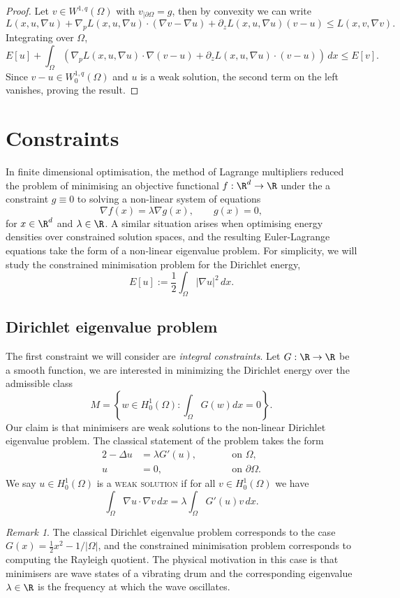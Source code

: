 \documentclass[reqno]{amsart}
\theoremstyle{definition}
\theoremstyle{remark}
\newtheorem*{remark}{Remark}
\renewcommand{\emph}{\textsc}
\begin{document}
\begin{proof}
	Let $v \in W^{1, q} (\Omega)$ with $v_{|\partial\Omega} = g$, then by convexity we can write
		\[ L(x, u, \nabla u) + \nabla_p L(x, u, \nabla u) \cdot (\nabla v - \nabla u) + \partial_z L(x, u, \nabla u) (v - u) \leq L(x, v, \nabla v). \]
	Integrating over $\Omega$, 
		\[ E[u] +  \int_\Omega \left(\nabla_p L(x, u, \nabla u) \cdot \nabla (v - u) + \partial_z L(x, u, \nabla u) \cdot (v - u) \right) \, dx \leq E[v].\]
	Since $v - u \in W^{1, q}_0 (\Omega)$ and $u$ is a weak solution, the second term on the left vanishes, proving the result. 		
\end{proof}

\section{Constraints}

In finite dimensional optimisation, the method of Lagrange multipliers reduced the problem of minimising an objective functional $f :\R^d \to \R$ under the a constraint $g \equiv 0$ to solving a non-linear system of equations 
	\[ \nabla f(x) = \lambda \nabla g(x), \qquad g(x) = 0, \]
for $x \in \R^d$ and $\lambda \in \R$. A similar situation arises when optimising energy densities over constrained solution spaces, and the resulting Euler-Lagrange equations take the form of a non-linear eigenvalue problem. For simplicity, we will study the constrained minimisation problem for the Dirichlet energy,
	\[ E[u] := \frac12 \int_\Omega |\nabla u|^2 \, dx. \]

\subsection{Dirichlet eigenvalue problem}

The first constraint we will consider are \textit{integral constraints}. Let $G: \R \to \R$ be a smooth function, we are interested in minimizing the Dirichlet energy over the admissible class
	\[ M = \left\{ w \in H^1_0(\Omega) : \int_\Omega G (w) dx = 0 \right\}.  \]
Our claim is that minimisers are weak solutions to the non-linear Dirichlet eigenvalue problem. The classical statement of the problem takes the form 	
	\begin{alignat*}{2}
				-\Delta u &= \lambda G'(u), 	& \qquad &\text{on } \Omega, \\
				u &= 0, 	&	&\text{on } \partial \Omega.
	\end{alignat*}
	We say $u \in H^1_0 (\Omega)$ is a \emph{weak solution} if for all $v \in H_0^1 (\Omega)$ we have
		\[ \int_\Omega \nabla u \cdot \nabla v \, dx = \lambda \int_\Omega G'(u) v \, dx .\]
\begin{remark}
	The classical Dirichlet eigenvalue problem corresponds to the case $G(x) = \tfrac12 x^2 - 1/|\Omega|$, and the constrained minimisation problem corresponds to computing the Rayleigh quotient. The physical motivation in this case is that minimisers are wave states of a vibrating drum and the corresponding eigenvalue $\lambda \in \R$ is the frequency at which the wave oscillates. 
\end{remark}
\end{document}
